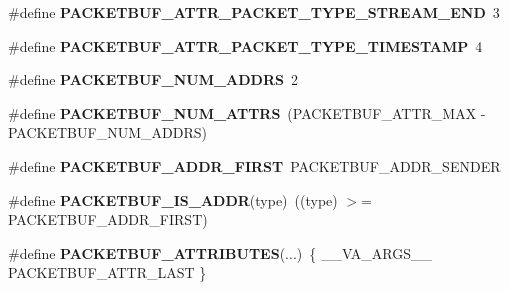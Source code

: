 \begin{DoxyCompactItemize}
\item 
\hypertarget{group__packetbuf_ga70f75d37e1db9371cdd0edd544efe639}{}\#define {\bfseries P\+A\+C\+K\+E\+T\+B\+U\+F\+\_\+\+A\+T\+T\+R\+\_\+\+P\+A\+C\+K\+E\+T\+\_\+\+T\+Y\+P\+E\+\_\+\+S\+T\+R\+E\+A\+M\+\_\+\+E\+N\+D}~3\label{group__packetbuf_ga70f75d37e1db9371cdd0edd544efe639}

\item 
\hypertarget{group__packetbuf_gafeaa40ccea6d3e55702071fc488b7abc}{}\#define {\bfseries P\+A\+C\+K\+E\+T\+B\+U\+F\+\_\+\+A\+T\+T\+R\+\_\+\+P\+A\+C\+K\+E\+T\+\_\+\+T\+Y\+P\+E\+\_\+\+T\+I\+M\+E\+S\+T\+A\+M\+P}~4\label{group__packetbuf_gafeaa40ccea6d3e55702071fc488b7abc}

\item 
\hypertarget{group__packetbuf_gacf293b790a9072c05c6b34f38e5c1cef}{}\#define {\bfseries P\+A\+C\+K\+E\+T\+B\+U\+F\+\_\+\+N\+U\+M\+\_\+\+A\+D\+D\+R\+S}~2\label{group__packetbuf_gacf293b790a9072c05c6b34f38e5c1cef}

\item 
\hypertarget{group__packetbuf_ga8a89c6f910cc654688984fb66630265c}{}\#define {\bfseries P\+A\+C\+K\+E\+T\+B\+U\+F\+\_\+\+N\+U\+M\+\_\+\+A\+T\+T\+R\+S}~(P\+A\+C\+K\+E\+T\+B\+U\+F\+\_\+\+A\+T\+T\+R\+\_\+\+M\+A\+X -\/ P\+A\+C\+K\+E\+T\+B\+U\+F\+\_\+\+N\+U\+M\+\_\+\+A\+D\+D\+R\+S)\label{group__packetbuf_ga8a89c6f910cc654688984fb66630265c}

\item 
\hypertarget{group__packetbuf_ga68297e1490c66b27b79d086f0afa6516}{}\#define {\bfseries P\+A\+C\+K\+E\+T\+B\+U\+F\+\_\+\+A\+D\+D\+R\+\_\+\+F\+I\+R\+S\+T}~P\+A\+C\+K\+E\+T\+B\+U\+F\+\_\+\+A\+D\+D\+R\+\_\+\+S\+E\+N\+D\+E\+R\label{group__packetbuf_ga68297e1490c66b27b79d086f0afa6516}

\item 
\hypertarget{group__packetbuf_ga097dd34bfa4307faa1e7f3c1a5765ace}{}\#define {\bfseries P\+A\+C\+K\+E\+T\+B\+U\+F\+\_\+\+I\+S\+\_\+\+A\+D\+D\+R}(type)~((type) $>$= P\+A\+C\+K\+E\+T\+B\+U\+F\+\_\+\+A\+D\+D\+R\+\_\+\+F\+I\+R\+S\+T)\label{group__packetbuf_ga097dd34bfa4307faa1e7f3c1a5765ace}

\item 
\hypertarget{group__packetbuf_gafd13fe2284d00adb7e8dfadd6ad38647}{}\#define {\bfseries P\+A\+C\+K\+E\+T\+B\+U\+F\+\_\+\+A\+T\+T\+R\+I\+B\+U\+T\+E\+S}(...)~\{ \+\_\+\+\_\+\+V\+A\+\_\+\+A\+R\+G\+S\+\_\+\+\_\+ P\+A\+C\+K\+E\+T\+B\+U\+F\+\_\+\+A\+T\+T\+R\+\_\+\+L\+A\+S\+T \}\label{group__packetbuf_gafd13fe2284d00adb7e8dfadd6ad38647}


\end{DoxyCompactItemize}
